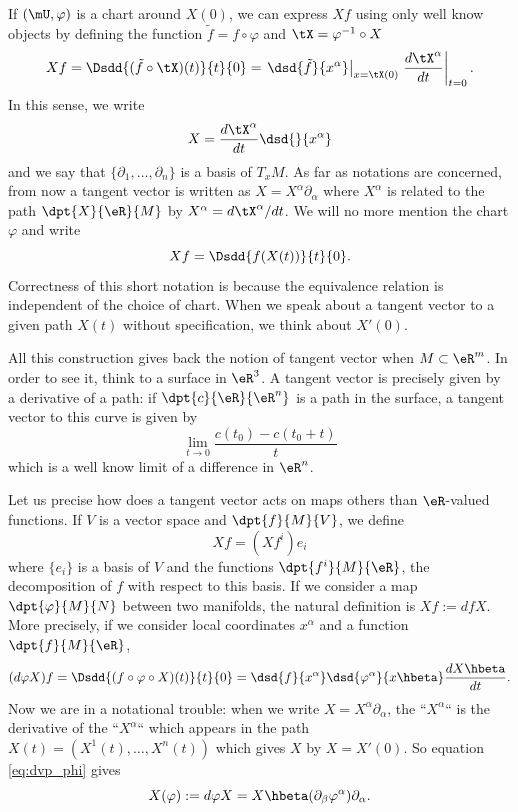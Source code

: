 If $(\mU,\varphi)$ is a chart around $X(0)$, we can express $Xf$ using only well know objects by defining the function $\tilde f =f\circ\varphi$ and $\tX=\varphi^{-1}\circ X$
\[
	Xf=\Dsdd{ (\tilde f \circ\tX)(t) }{t}{0}=\left.\dsd{\tilde f }{x^{\alpha}}\right|_{x=\tX(0)}\left.\frac{d\tX^{\alpha}}{dt}\right|_{t=0}.
\]
In this sense, we write
\begin{equation}
	X=\frac{d\tX^{\alpha}}{dt} \dsd{}{x^{\alpha}}
\end{equation}
and we say that $\{\partial_1,\ldots,\partial_n\}$ is a basis of $T_xM$. As far as notations are concerned, from now a tangent vector is written as $X=X^{\alpha}\partial_{\alpha}$ where $X^{\alpha}$ is related to the path $\dpt{X}{\eR}{M}$ by $X^{\alpha}=d\tX^{\alpha}/dt$. We will no more mention the chart $\varphi$ and write
\[
	Xf=\Dsdd{f(X(t))}{t}{0}.
\]
Correctness of this short notation is because the equivalence relation is independent of the choice of chart. When we speak about a tangent vector to a given path $X(t)$ without specification, we think about $X'(0)$.

All this construction gives back the notion of tangent vector when $M\subset \eR^m$. In order to see it, think to a surface in $\eR^3$. A tangent vector is precisely given by a derivative of a path: if $\dpt{c}{\eR}{\eR^n}$ is a path in the surface, a tangent vector to this curve is given by
\[
	\lim_{t\to 0}\frac{c(t_0)-c(t_0+t)}{t}
\]
which is a well know limit of a difference in $\eR^n$.

\label{pg:vecto_vecto}Let us precise how does a tangent vector acts on maps others than $\eR$-valued functions. If $V$ is a vector space and $\dpt{f}{M}{V}$, we define
\[
	Xf=(Xf^i)e_i
\]
where $\{e_i\}$ is a basis of $V$ and the functions $\dpt{f^i}{M}{\eR}$, the decomposition of $f$ with respect to this basis. If we consider a map $\dpt{\varphi}{M}{N}$ between two manifolds, the natural definition is $Xf:=dfX$. More precisely, if we consider local coordinates $x^{\alpha}$ and a function $\dpt{f}{M}{\eR}$,
\begin{equation}\label{eq:dvp_phi}
	(d\varphi X)f=\Dsdd{  (f\circ\varphi\circ X)(t) }{t}{0}=\dsd{f}{x^{\alpha}}\dsd{\varphi^{\alpha}}{x\hbeta}\frac{dX\hbeta}{dt}.
\end{equation}
Now we are in a notational trouble: when we write $X=X^{\alpha}\partial_{\alpha}$, the ``$X^{\alpha}$``{} is the derivative of the ``$X^{\alpha}$``{} which appears in the path $X(t)=(X^1(t),\ldots,X^n(t))$ which gives $X$ by $X=X'(0)$. So equation \eqref{eq:dvp_phi} gives
\begin{equation}
	X(\varphi):=d\varphi X=X\hbeta(\partial_{\beta}\varphi^{\alpha})\partial_{\alpha}.
\end{equation}


